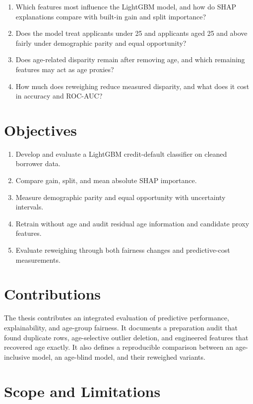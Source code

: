 \begin{enumerate}
  \item Which features most influence the LightGBM model, and how do SHAP
  explanations compare with built-in gain and split importance?
  \item Does the model treat applicants under 25 and applicants aged 25 and
  above fairly under demographic parity and equal opportunity?
  \item Does age-related disparity remain after removing age, and which
  remaining features may act as age proxies?
  \item How much does reweighing reduce measured disparity, and what does it
  cost in accuracy and ROC-AUC?
\end{enumerate}

\section{Objectives}

\begin{enumerate}
  \item Develop and evaluate a LightGBM credit-default classifier on cleaned
  borrower data.
  \item Compare gain, split, and mean absolute SHAP importance.
  \item Measure demographic parity and equal opportunity with uncertainty
  intervals.
  \item Retrain without age and audit residual age information and candidate
  proxy features.
  \item Evaluate reweighing through both fairness changes and predictive-cost
  measurements.
\end{enumerate}

\section{Contributions}

The thesis contributes an integrated evaluation of predictive performance,
explainability, and age-group fairness. It documents a preparation audit that
found duplicate rows, age-selective outlier deletion, and engineered features
that recovered age exactly. It also defines a reproducible comparison between
an age-inclusive model, an age-blind model, and their reweighed variants.

\section{Scope and Limitations}

